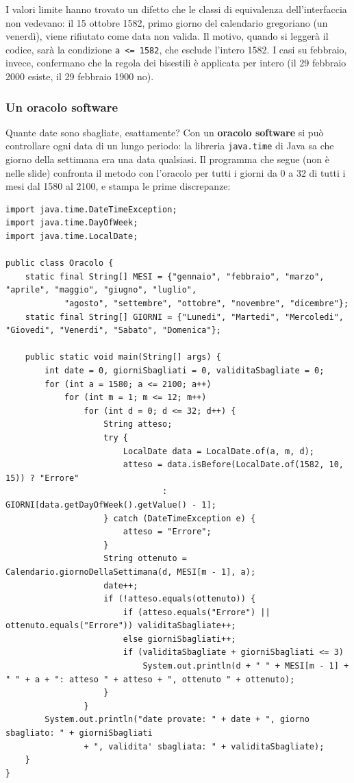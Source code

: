 I valori limite hanno trovato un difetto che le classi di equivalenza dell'interfaccia non vedevano: il 15 ottobre
1582, primo giorno del calendario gregoriano (un venerdì), viene rifiutato come data non valida. Il motivo, quando si
leggerà il codice, sarà la condizione \texttt{a <= 1582}, che esclude l'intero 1582. I casi su febbraio, invece,
confermano che la regola dei bisestili è applicata per intero (il 29 febbraio 2000 esiste, il 29 febbraio 1900 no).

\subsubsection*{Un oracolo software}

Quante date sono sbagliate, esattamente? Con un \textbf{oracolo software} si può controllare ogni data di un lungo
periodo: la libreria \texttt{java.time} di Java sa che giorno della settimana era una data qualsiasi. Il programma che
segue (non è nelle slide) confronta il metodo con l'oracolo per tutti i giorni da 0 a 32 di tutti i mesi dal 1580 al
2100, e stampa le prime discrepanze:

\begin{lstlisting}[style=java, name=Oracolo.java]
import java.time.DateTimeException;
import java.time.DayOfWeek;
import java.time.LocalDate;

public class Oracolo {
    static final String[] MESI = {"gennaio", "febbraio", "marzo", "aprile", "maggio", "giugno", "luglio",
            "agosto", "settembre", "ottobre", "novembre", "dicembre"};
    static final String[] GIORNI = {"Lunedi", "Martedi", "Mercoledi", "Giovedi", "Venerdi", "Sabato", "Domenica"};

    public static void main(String[] args) {
        int date = 0, giorniSbagliati = 0, validitaSbagliate = 0;
        for (int a = 1580; a <= 2100; a++)
            for (int m = 1; m <= 12; m++)
                for (int d = 0; d <= 32; d++) {
                    String atteso;
                    try {
                        LocalDate data = LocalDate.of(a, m, d);
                        atteso = data.isBefore(LocalDate.of(1582, 10, 15)) ? "Errore"
                                : GIORNI[data.getDayOfWeek().getValue() - 1];
                    } catch (DateTimeException e) {
                        atteso = "Errore";
                    }
                    String ottenuto = Calendario.giornoDellaSettimana(d, MESI[m - 1], a);
                    date++;
                    if (!atteso.equals(ottenuto)) {
                        if (atteso.equals("Errore") || ottenuto.equals("Errore")) validitaSbagliate++;
                        else giorniSbagliati++;
                        if (validitaSbagliate + giorniSbagliati <= 3)
                            System.out.println(d + " " + MESI[m - 1] + " " + a + ": atteso " + atteso + ", ottenuto " + ottenuto);
                    }
                }
        System.out.println("date provate: " + date + ", giorno sbagliato: " + giorniSbagliati
                + ", validita' sbagliata: " + validitaSbagliate);
    }
}
\end{lstlisting}

